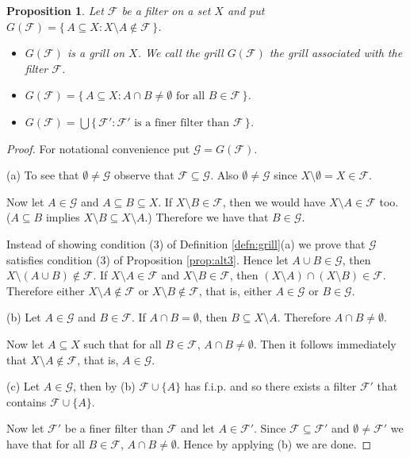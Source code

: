 \documentclass[12pt]{article}
\theoremstyle{plain}
\newtheorem{prop}[thm]{Proposition}
\theoremstyle{definition}
\newcommand{\calF}{\mathcal{F}}
\newcommand{\calG}{\mathcal{G}}
\begin{document}
\begin{prop}
  \label{prop:FltGrl}
  Let $\calF$ be a filter on a set $X$ and put $G(\calF) = \{\, A \subseteq X : X \setminus A \not\in \calF \,\}$.
  \begin{itemize}
    \item[(a)] $G(\calF)$ is a grill on $X$.
      We call the grill $G(\calF)$ the grill \textsl{associated with the filter $\calF$}.
    \item[(b)] $G(\calF) = \{\, A \subseteq X : A \cap B \ne \emptyset \mbox{ for all $B \in \calF$} \,\}$.
    \item[(c)] $G(\calF) = \bigcup\{\, \calF' : \mbox{$\calF'$ is a finer filter than $\calF$} \,\}$.
  \end{itemize}
\end{prop}
\begin{proof}
  For notational convenience put $\calG = G(\calF)$.
 
  (a)
  To see that $\emptyset \ne \calG$ observe that $\calF \subseteq \calG$.
  Also $\emptyset \ne \calG$ since $X \setminus \emptyset = X \in \calF$.

  Now let $A \in \calG$ and $A \subseteq B \subseteq X$.
  If $X \setminus B \in \calF$, then we would have $X \setminus A \in \calF$ too.
  ($A \subseteq B$ implies $X \setminus B \subseteq X \setminus A$.)
  Therefore we have that $B \in \calG$.

  Instead of showing condition (3) of Definition \ref{defn:grill}(a) we prove that $\calG$ satisfies condition (3) of Proposition \ref{prop:alt3}.
  Hence let $A \cup B \in \calG$, then $X \setminus (A \cup B) \not\in \calF$.
  If $X \setminus A \in \calF$ and $X \setminus B \in \calF$, then $(X \setminus A) \cap (X \setminus B) \in \calF$.
  Therefore either $X \setminus A \not\in \calF$ or $X \setminus B \not\in \calF$, that is, either $A \in \calG$ or $B \in \calG$.

  (b)
  Let $A \in \calG$ and $B \in \calF$.
  If $A \cap B = \emptyset$, then $B \subseteq X \setminus A$. 
  Therefore $A \cap B \ne \emptyset$.

  Now let $A \subseteq X$ such that for all $B \in \calF$, $A \cap B \ne \emptyset$.
  Then it follows immediately that $X \setminus A \not\in \calF$, that is, $A \in \calG$.

  (c)
  Let $A \in \calG$, then by (b) $\calF \cup \{A\}$ has f.i.p. and so there exists a filter $\calF'$ that contains $\calF \cup \{A\}$.
  
  Now let $\calF'$ be a finer filter than $\calF$ and let $A \in \calF'$. 
  Since $\calF \subseteq \calF'$ and $\emptyset \ne \calF'$ we have that for all $B \in \calF$, $A \cap B \ne \emptyset$.
  Hence by applying (b) we are done.
\end{proof}
\end{document}
